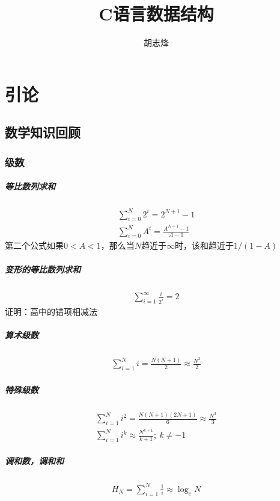 \documentclass[utf8]{ctexbook}
\author{胡志烽}
\title{C语言数据结构}
\begin{document}
\maketitle
\songti
\chapter{引论}
\section{数学知识回顾}
\subsection{级数}
\paragraph{等比数列求和}
\begin{gather*}
    \sum_{i=0}^{N } 2^i = 2^{N+1} -1
    \\ \sum_{i=0}^{N } A^i = \frac{A^{N+1}-1}{A-1}
\end{gather*}
第二个公式如果$0<A<1$，那么当$N$趋近于$\infty$时，该和趋近于$1/(1-A)$
\paragraph{变形的等比数列求和}
\begin{gather*}
\sum_{i=1 }^{\infty } \frac{i }{2^i } = 2
\end{gather*}
证明：高中的错项相减法
\paragraph{算术级数}
\begin{gather*}
\sum_{i=1 }^{N } i = \frac{N(N+1)}{2}\approx \frac{N^2}{2}
\end{gather*}
\paragraph{特殊级数}
\begin{gather*}
    \sum_{i=1 }^{N}  i^2 = \frac{N(N+1)(2N+1)}{6}\approx \frac{N^3}3
    \\ \sum_{i=1 }^{N}  i ^k \approx \frac{N^{k+1 }}{k+1};\ k\ne -1
\end{gather*}
\paragraph{调和数，调和和}
\begin{gather*}
H_N = \sum_{i=1 }^{N } \frac 1i \approx \log _e N
\end{gather*}
\end{document}

